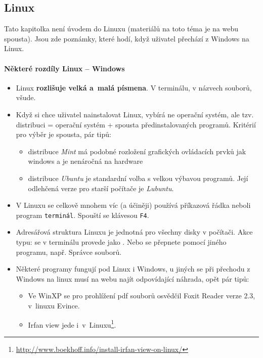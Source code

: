 \subsection{Linux} 

Tato kapitolka není úvodem do Linuxu (materiálů na toto téma je na webu spousta).  Jsou zde poznámky, které hodí, když uživatel přechází z Windows na Linux. 

\paragraph{Některé rozdíly Linux -- Windows}

\begin{itemize}

\item Linux {\bf rozlišuje velká a~malá písmena}. V terminálu, v názvech souborů, všude. 

\item Když si chce uživatel nainstalovat Linux, vybírá ne operační systém, ale tzv. distribuci = operační systém + spousta předinstalovaných programů. Kritérií pro výběr je spousta, pár tipů: 

	\begin{itemize}
		\item distribuce {\it Mint} má podobné rozložení grafických ovládacích prvků jak windows a je nenáročná na hardware 
	
		\item distribuce {\it Ubuntu} je standardní volba s velkou výbavou programů. Její odlehčená verze pro starší počítače je {\it Lubuntu}. 
	
	\end{itemize}  

\item V Linuxu se celkově mnohem víc (a účiněji) používá příkazová řádka neboli program  {\tt terminál}.  Spouští se klávesou {\tt F4}. 

\item Adresářová struktura Linuxu je jednotná pro všechny disky v počítači. Akce typu: {\it {} } se v terminálu provede jako {\it {} }. Nebo se přepnete pomocí jiného programu, např. Správce souborů. 	
	
\item Některé programy fungují pod Linux i Windows, u jiných se při přechodu z Windows na linux musí na webu najít odpovídající náhrada, opět pár tipů: 

	\begin{itemize}
		\item Ve WinXP se pro prohlížení pdf souborů osvědčil Foxit Reader verze 2.3, v~linuxu Evince.  
			
		\item Irfan view jede i~v~Linuxu\footnote{\url{http://www.boekhoff.info/install-irfan-view-on-linux/}}.
	
	\end{itemize}

	
\end{itemize}


